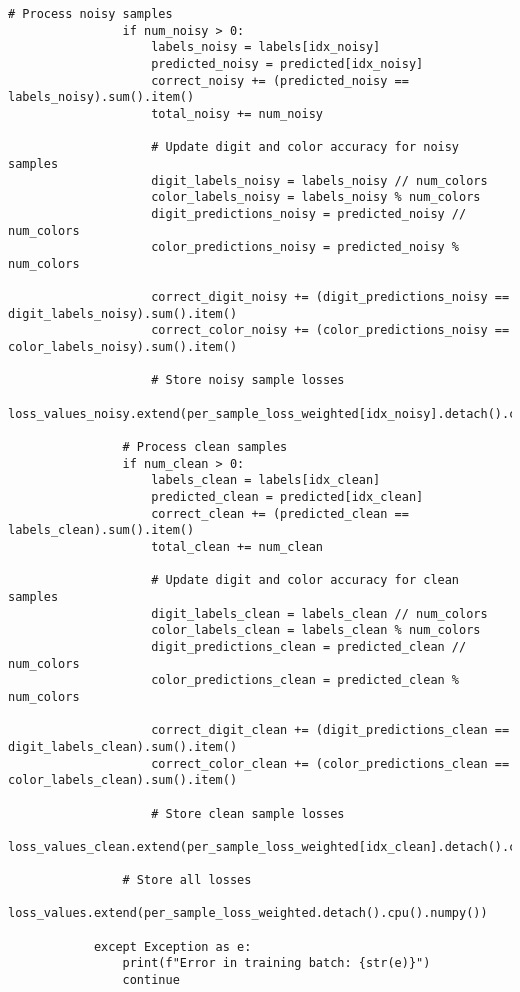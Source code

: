 \begin{lstlisting}[style=pythonstyle, caption={Program Example}]
                # Process noisy samples
                if num_noisy > 0:
                    labels_noisy = labels[idx_noisy]
                    predicted_noisy = predicted[idx_noisy]
                    correct_noisy += (predicted_noisy == labels_noisy).sum().item()
                    total_noisy += num_noisy
    
                    # Update digit and color accuracy for noisy samples
                    digit_labels_noisy = labels_noisy // num_colors
                    color_labels_noisy = labels_noisy % num_colors
                    digit_predictions_noisy = predicted_noisy // num_colors
                    color_predictions_noisy = predicted_noisy % num_colors
    
                    correct_digit_noisy += (digit_predictions_noisy == digit_labels_noisy).sum().item()
                    correct_color_noisy += (color_predictions_noisy == color_labels_noisy).sum().item()
    
                    # Store noisy sample losses
                    loss_values_noisy.extend(per_sample_loss_weighted[idx_noisy].detach().cpu().numpy())
    
                # Process clean samples
                if num_clean > 0:
                    labels_clean = labels[idx_clean]
                    predicted_clean = predicted[idx_clean]
                    correct_clean += (predicted_clean == labels_clean).sum().item()
                    total_clean += num_clean
    
                    # Update digit and color accuracy for clean samples
                    digit_labels_clean = labels_clean // num_colors
                    color_labels_clean = labels_clean % num_colors
                    digit_predictions_clean = predicted_clean // num_colors
                    color_predictions_clean = predicted_clean % num_colors
    
                    correct_digit_clean += (digit_predictions_clean == digit_labels_clean).sum().item()
                    correct_color_clean += (color_predictions_clean == color_labels_clean).sum().item()
    
                    # Store clean sample losses
                    loss_values_clean.extend(per_sample_loss_weighted[idx_clean].detach().cpu().numpy())
    
                # Store all losses
                loss_values.extend(per_sample_loss_weighted.detach().cpu().numpy())
    
            except Exception as e:
                print(f"Error in training batch: {str(e)}")
                continue
    

\end{lstlisting}
